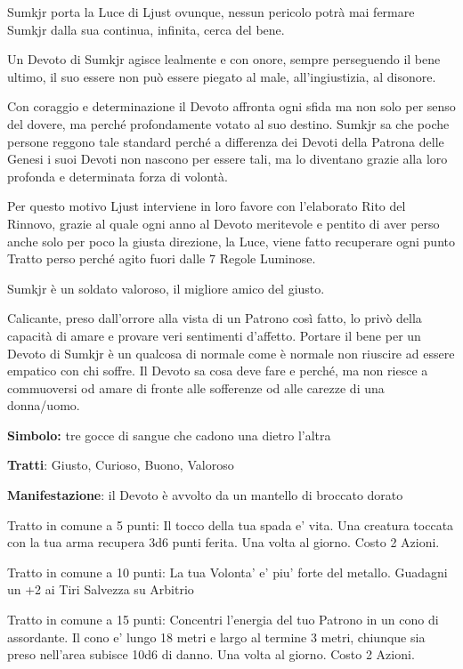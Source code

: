 \documentclass[a4paper,11pt,twoside,openany]{book}
\begin{document}
Sumkjr porta la Luce di Ljust ovunque, nessun pericolo potrà mai fermare Sumkjr dalla sua continua, infinita, cerca del bene.

Un Devoto di Sumkjr agisce lealmente e con onore, sempre perseguendo il bene ultimo, il suo essere non può essere piegato al male, all'ingiustizia, al disonore.

Con coraggio e determinazione il Devoto affronta ogni sfida ma non solo per senso del dovere, ma perché profondamente votato al suo destino. Sumkjr sa che poche persone reggono tale standard perché a differenza dei Devoti della Patrona delle Genesi i suoi Devoti non nascono per essere tali, ma lo diventano grazie alla loro profonda e determinata forza di volontà.

Per questo motivo Ljust interviene in loro favore con l'elaborato Rito del Rinnovo, grazie al quale ogni anno al Devoto meritevole e pentito di aver perso anche solo per poco la giusta direzione, la Luce, viene fatto recuperare ogni punto Tratto perso perché agito fuori dalle 7 Regole Luminose.

Sumkjr è un soldato valoroso, il migliore amico del giusto.

Calicante, preso dall'orrore alla vista di un Patrono così fatto, lo privò della capacità di amare e provare veri sentimenti d'affetto. Portare il bene per un Devoto di Sumkjr è un qualcosa di normale come è normale non riuscire ad essere empatico con chi soffre. Il Devoto sa cosa deve fare e perché, ma non riesce a commuoversi od amare di fronte alle sofferenze od alle carezze di una donna/uomo.

\textbf{Simbolo:} tre gocce di sangue che cadono una dietro l'altra

\textbf{Tratti}: Giusto, Curioso, Buono, Valoroso

\textbf{Manifestazione}: il Devoto è avvolto da un mantello di broccato dorato

\bigskip

Tratto in comune a 5 punti: Il tocco della tua spada e’ vita. Una creatura toccata con la tua arma recupera 3d6 punti ferita. Una volta al giorno. Costo 2 Azioni.

Tratto in comune a 10 punti: La tua Volonta’ e’ piu’ forte del metallo. Guadagni un +2 ai Tiri Salvezza su Arbitrio

Tratto in comune a 15 punti: Concentri l’energia del tuo Patrono in un cono di assordante. Il cono e’ lungo 18 metri e largo al termine 3 metri, chiunque sia preso nell’area subisce 10d6 di danno.
Una volta al giorno. Costo 2 Azioni.
\end{document}
